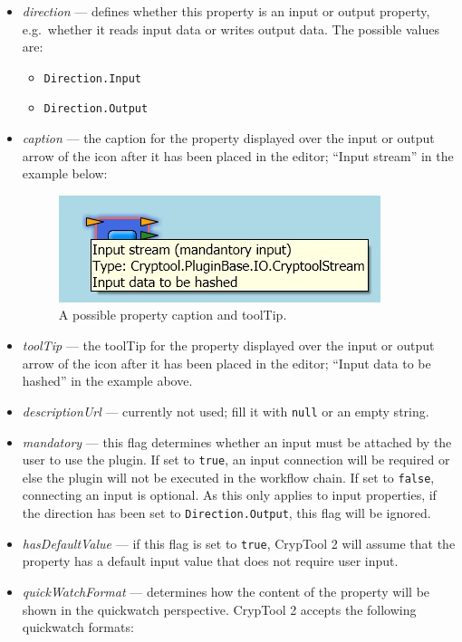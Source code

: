\begin{itemize}
	\item \textit{direction} --- defines whether this property is an input or output property, e.g.\ whether it reads input data or writes output data. The possible values are:
	\begin{itemize}
		\item \texttt{Direction.Input}
		\item \texttt{Direction.Output}
	\end{itemize}
	\item \textit{caption} --- the caption for the property displayed over the input or output arrow of the icon after it has been placed in the editor; ``Input stream'' in the example below:
	
\begin{figure}[h!]
	\centering
		\includegraphics[width=.55\textwidth]{figures/property_caption.jpg}
	\caption{A possible property caption and toolTip.}
	\label{fig:property_caption}
\end{figure}

	\item \textit{toolTip} --- the toolTip for the property displayed over the input or output arrow of the icon after it has been placed in the editor; ``Input data to be hashed'' in the example above.
	\item \textit{descriptionUrl} --- currently not used; fill it with \texttt{null} or an empty string.
	\item \textit{mandatory} --- this flag determines whether an input must be attached by the user to use the plugin. If set to \texttt{true}, an input connection will be required or else the plugin will not be executed in the workflow chain. If set to \texttt{false}, connecting an input is optional. As this only applies to input properties, if the direction has been set to \texttt{Direction.Output}, this flag will be ignored.
	\item \textit{hasDefaultValue} --- if this flag is set to \texttt{true}, CrypTool 2 will assume that the property has a default input value that does not require user input.
	
	\item \textit{quickWatchFormat} --- determines how the content of the property will be shown in the quickwatch perspective. CrypTool 2 accepts the following quickwatch formats:
	

\end{itemize}
